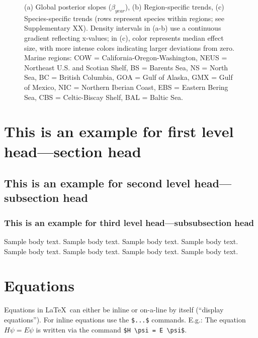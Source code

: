 \documentclass[lineno,pdflatex,sn-nature]{sn-jnl}%
\begin{document}
\begin{figure}[h]
{(a) Global posterior slopes ($\beta_{year}$),  
(b) Region-specific trends,  
(c) Species-specific trends (rows represent species within regions; see Supplementary XX).  
Density intervals in (a-b) use a continuous gradient reflecting x-values; in (c), color represents median effect size, with more intense colors indicating larger deviations from zero.  
Marine regions: COW = California-Oregon-Washington, NEUS = Northeast U.S. and Scotian Shelf, BS = Barents Sea, NS = North Sea, BC = British Columbia, GOA = Gulf of Alaska, GMX = Gulf of Mexico, NIC = Northern Iberian Coast, EBS = Eastern Bering Sea, CBS = Celtic-Biscay Shelf, BAL = Baltic Sea.}
\end{figure}


\section{This is an example for first level head---section head}\label{sec3}

\subsection{This is an example for second level head---subsection head}\label{subsec2}

\subsubsection{This is an example for third level head---subsubsection head}\label{subsubsec2}

Sample body text. Sample body text. Sample body text. Sample body text. Sample body text. Sample body text. Sample body text. Sample body text. 

\section{Equations}\label{sec4}

Equations in \LaTeX\ can either be inline or on-a-line by itself (``display equations''). For
inline equations use the \verb+$...$+ commands. E.g.: The equation
$H\psi = E \psi$ is written via the command \verb+$H \psi = E \psi$+.
\end{document}
